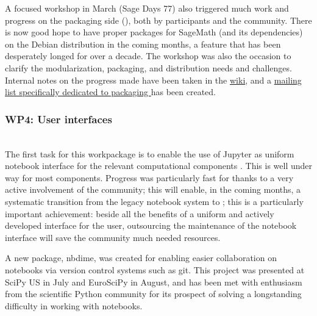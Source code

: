 \documentclass{deliverablereport}
\begin{document}
A focused workshop in March (Sage Days 77) also triggered much work
and progress on the packaging side
(), both by \ODK
participants and the community. There is now good hope to have proper
packages for SageMath (and its dependencies) on the Debian
distribution in the coming months, a feature that has been desperately
longed for over a decade.  The workshop was also the occasion to
clarify the modularization, packaging, and distribution needs and
challenges. Internal notes on the progress made have been taken in the
\href{https://wiki.sagemath.org/days77/packaging}{\Sage wiki}, and a
\href{https://groups.google.com/forum/#!forum/sage-packaging}{mailing
  list specifically dedicated to packaging \Sage} has been created.

\subsubsection{WP4: User interfaces}

~\\The first task for this workpackage is to enable the use of Jupyter as
uniform notebook interface for the relevant computational components
. This is well under way for most
components. Progress was particularly fast for \Sage thanks to a
very active involvement of the community; this will enable, in the
coming months, a systematic transition from the legacy \Sage
notebook system to \Jupyter; this is a particularly important
achievement: beside all the benefits of a uniform and actively
developed interface for the user, outsourcing the maintenance of the
notebook interface will save the \Sage community much needed
resources.

A new \Jupyter package, nbdime, was created for 
enabling easier collaboration on notebooks via version control systems such as git.
This project was presented at SciPy US in July and EuroSciPy in August,
and has been met with enthusiasm from the scientific Python community
for its prospect of solving a longstanding difficulty in working with notebooks.

\end{document}
